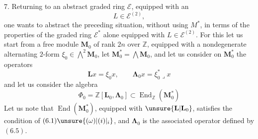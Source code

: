 7. Returning to an abstract graded ring $\mathcal E$, equipped with an
\[
L\in\mathcal E^{(2)},
\]
one wants to abstract the preceding situation, without using $M^*$, in terms of the properties of the graded ring  $\mathcal E^*$ alone equipped with $L\in\mathcal E^{(2)}$.
For this let us start  from a free module $\mathbf M_0$ of rank $2n$ over $\mathbb Z$, equipped with a nondegenerate alternating $2$-form  $\xi_0\in\bigwedge^2\mathbf M_0$,  let \deleted{$\xi$} $\mathbf M_0^*=\bigwedge\mathbf M_0$, and let us consider on $\mathbf M_0^*$ the operators
\[
\mathbf Lx=\xi_0x,\qquad\boldsymbol\Lambda_0x=\xi_0^*\mathbin{\lrcorner}x
\]
and let us consider the algebra
\[
\Phi_0=\mathbb Z[\mathbf L_0,\boldsymbol\Lambda_0]\subset\operatorname{End}_{\mathbb Z}(\mathbf M_0^*)
\]
Let us note that $\operatorname{End}(\mathbf M_0^*)$,  equipped with $\unsure{\mathbf L|\mathbf L_0}$, satisfies the condition of $(6.1)\unsure{(\omega)|(i)|_i}$,  and \deleted{$\xi$} $\boldsymbol\Lambda_0$ is the associated operator defined by $(6.5)$.
